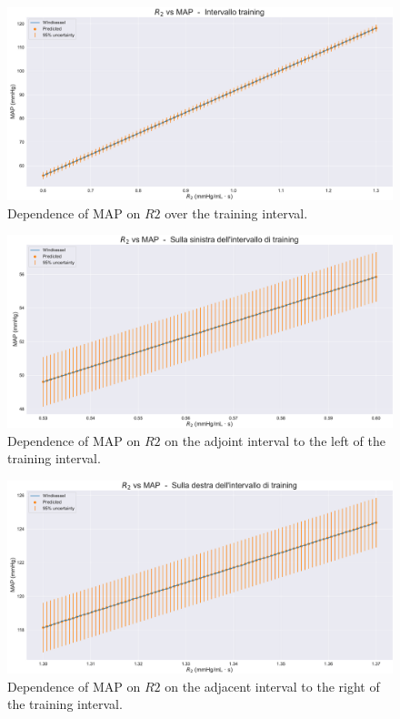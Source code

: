 \vspace{1cm}

\begin{figure}[!htb]
    \centering
    \includegraphics[width=1\textwidth]{images/Training (risultati)/MAP/MAP - R2 - training.pdf}
    \caption{Dependence of MAP on $R2$ over the training interval.}
    \label{MAP - R2 - training}
\end{figure}

\begin{figure}
    \centering
    \includegraphics[width=1\textwidth]{images/Training (risultati)/MAP/MAP - R2 - sx.pdf}
    \caption{Dependence of MAP on $R2$ on the adjoint interval to the left of the training interval.}
    \label{MAP - R2 - sx}
\end{figure}


\begin{figure}
    \centering
    \includegraphics[width=1\textwidth]{images/Training (risultati)/MAP/MAP - R2 - dx.pdf}
    \caption{Dependence of MAP on $R2$ on the adjacent interval to the right of the training interval.}
    \label{MAP - R2 - dx}
\end{figure}







